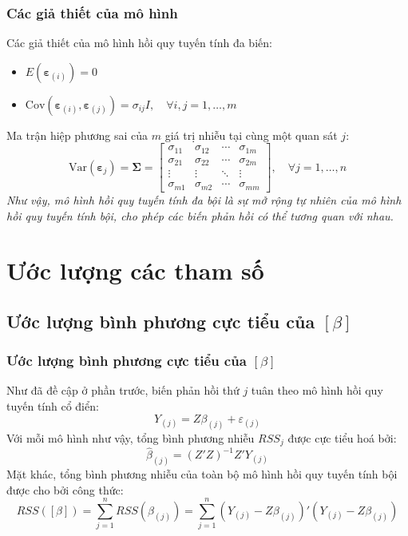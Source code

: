 \begin{frame}
\frametitle{Các giả thiết của mô hình}
Các giả thiết của mô hình hồi quy tuyến tính đa biến:
\begin{itemize}
    \item $E(\boldsymbol{\varepsilon}_{(i)}) = 0$
    \item $\mathrm{Cov}(\boldsymbol{\varepsilon}_{(i)}, \boldsymbol{\varepsilon}_{(j)}) = \sigma_{ij} I, \quad \forall i,j = 1,\dots,m$
\end{itemize}
Ma trận hiệp phương sai của $m$ giá trị nhiễu tại cùng một quan sát $j$:
\[
\mathrm{Var}(\boldsymbol{\varepsilon}_j) = 
\boldsymbol{\Sigma} =
\begin{bmatrix}
\sigma_{11} & \sigma_{12} & \cdots & \sigma_{1m} \\
\sigma_{21} & \sigma_{22} & \cdots & \sigma_{2m} \\
\vdots & \vdots & \ddots & \vdots \\
\sigma_{m1} & \sigma_{m2} & \cdots & \sigma_{mm}
\end{bmatrix}, \quad \forall j = 1,\dots,n
\]
\textit{Như vậy, mô hình hồi quy tuyến tính đa bội là sự mở rộng tự nhiên của mô hình hồi quy tuyến tính bội, cho phép các biến phản hồi có thể tương quan với nhau.}
\end{frame}

\section{Ước lượng các tham số}
\subsection{Ước lượng bình phương cực tiểu của \texorpdfstring{$[\beta]$}{[beta]}}
\begin{frame}
\frametitle{Ước lượng bình phương cực tiểu của $[\beta]$}
Như đã đề cập ở phần trước, biến phản hồi thứ $j$ tuân theo mô hình hồi quy tuyến tính cổ điển:
\[
Y_{(j)} = Z\beta_{(j)} + \varepsilon_{(j)}
\]
Với mỗi mô hình như vậy, tổng bình phương nhiễu $RSS_j$ được cực tiểu hoá bởi:
\[
\widehat{\beta}_{(j)} = (Z'Z)^{-1}Z'Y_{(j)}
\]
Mặt khác, tổng bình phương nhiễu của toàn bộ mô hình hồi quy tuyến tính bội được cho bởi công thức:
\[
RSS([\beta]) = \sum_{j=1}^{n}RSS(\beta_{(j)}) 
= \sum_{j=1}^{n}(Y_{(j)} - Z\beta_{(j)})'(Y_{(j)} - Z\beta_{(j)})
\]
\end{frame}

